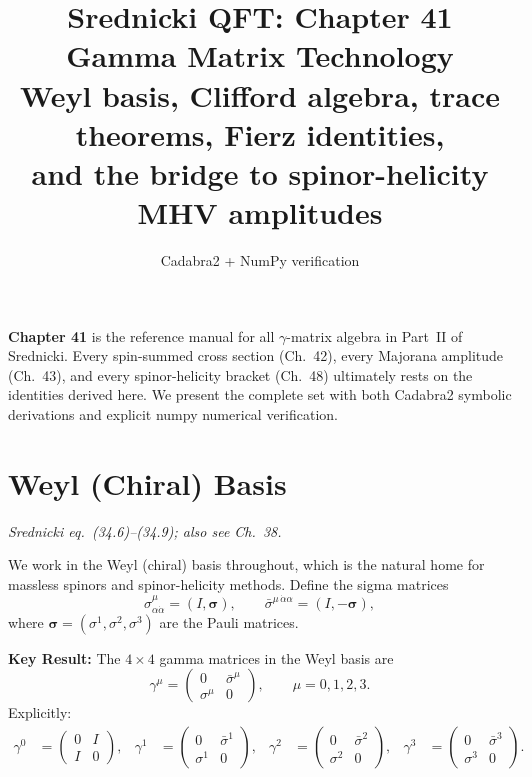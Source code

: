 \documentclass[12pt]{article}
\title{\textbf{Srednicki QFT: Chapter 41}\\[6pt]
       \large Gamma Matrix Technology\\[4pt]
       \normalsize Weyl basis, Clifford algebra, trace theorems, Fierz identities,\\
       and the bridge to spinor-helicity MHV amplitudes}
\author{Cadabra2 + NumPy verification}
\date{}
\begin{document}
\maketitle
\tableofcontents
\newpage

\begin{mdframed}[backgroundcolor=blue!5]
\textbf{Chapter 41} is the reference manual for all $\gamma$-matrix algebra in
Part~II of Srednicki.  Every spin-summed cross section (Ch.~42), every Majorana
amplitude (Ch.~43), and every spinor-helicity bracket (Ch.~48) ultimately rests
on the identities derived here.  We present the complete set with both
Cadabra2 symbolic derivations and explicit numpy numerical verification.
\end{mdframed}

\section{Weyl (Chiral) Basis}

\textit{Srednicki eq.\ (34.6)--(34.9); also see Ch.~38.}

We work in the Weyl (chiral) basis throughout, which is the natural home for
massless spinors and spinor-helicity methods.  Define the sigma matrices
\begin{equation}
  \sigma^\mu_{\alpha\dot\alpha} = (I, \boldsymbol{\sigma}),
  \qquad
  \bar\sigma^{\mu\,\dot\alpha\alpha} = (I, -\boldsymbol{\sigma}),
\end{equation}
where $\boldsymbol{\sigma} = (\sigma^1,\sigma^2,\sigma^3)$ are the Pauli matrices.

\begin{mdframed}[backgroundcolor=blue!5]
\textbf{Key Result:} The $4\times4$ gamma matrices in the Weyl basis are
\begin{equation}\label{eq:weyl-gamma}
  \gamma^\mu = \begin{pmatrix} 0 & \bar\sigma^\mu \\ \sigma^\mu & 0 \end{pmatrix},
  \qquad \mu = 0,1,2,3.
\end{equation}
Explicitly:
\begin{align}
  \gamma^0 &= \begin{pmatrix}0&I\\I&0\end{pmatrix}, &
  \gamma^1 &= \begin{pmatrix}0&\bar\sigma^1\\\sigma^1&0\end{pmatrix}, &
  \gamma^2 &= \begin{pmatrix}0&\bar\sigma^2\\\sigma^2&0\end{pmatrix}, &
  \gamma^3 &= \begin{pmatrix}0&\bar\sigma^3\\\sigma^3&0\end{pmatrix}.
\end{align}
\end{mdframed}
\end{document}
